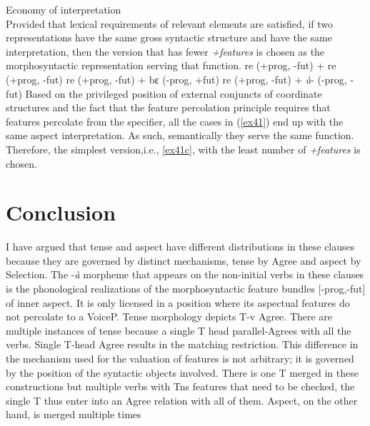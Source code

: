 \documentclass[output=paper,colorlinks,citecolor=brown]{langscibook}
\begin{document}
\ea
Economy of interpretation\\
Provided that lexical requirements of relevant elements are satisfied, if two representations have the same gross syntactic structure and have the same interpretation, then the version that has fewer \emph{+features} is chosen as the morphosyntactic representation serving that function.
\z
\ea \label{ex41}
\ea  *re  (+prog, -fut) + re  (+prog, -fut)  
\ex *re (+prog, -fut) + bɛ (-prog, +fut)
	\ex \label{ex41c} re (+prog, -fut) + \emph{\`a}- (-prog, -fut)
\z
\z
Based on the privileged position of external conjuncts of coordinate structures and the fact that the feature percolation principle requires that features percolate from the specifier, all the cases in (\ref{ex41}) end up with the same aspect interpretation. As such, semantically they serve the same function. Therefore, the simplest version,i.e., \ref{ex41c}, with the least number of \emph{+features} is chosen. 


\section{Conclusion}
I have argued that tense and aspect have different distributions in these clauses because they are governed by distinct mechanisms, tense by Agree and aspect by Selection. The -\emph{\`a} morpheme that appears on the non-initial verbs in these clauses is the phonological realizations of the morphosyntactic feature bundles [-prog,-fut] of inner aspect. It is only licensed in a position where its aspectual features do not percolate to a VoiceP. Tense morphology depicts T-v Agree. There are multiple instances of tense because a single T head parallel-Agrees with all the verbs. Single T-head Agree results in the matching restriction. This difference in the mechanism used for the valuation of features is not arbitrary; it is governed by the position of the syntactic objects involved. There is one T merged in these constructions but multiple verbs with Tns features that need to be checked, the single T thus enter into an Agree relation with all of them.  Aspect, on the other hand,  is merged multiple times 



\end{document}
